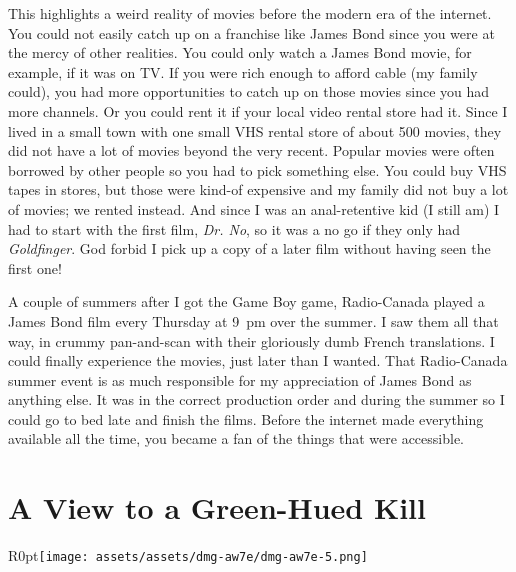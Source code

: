 \documentclass{book}
\begin{document}
This highlights a weird reality of movies before the modern era of the internet. You could not easily catch up on a franchise like James Bond since you were at the mercy of other realities. You could only watch a James Bond movie, for example, if it was on TV. If you were rich enough to afford cable (my family could), you had more opportunities to catch up on those movies since you had more channels. Or you could rent it if your local video rental store had it. Since I lived in a small town with one small VHS rental store of about 500 movies, they did not have a lot of movies beyond the very recent. Popular movies were often borrowed by other people so you had to pick something else. You could buy VHS tapes in stores, but those were kind-of expensive and my family did not buy a lot of movies; we rented instead. And since I was an anal-retentive kid (I still am) I had to start with the first film, \emph{Dr. No}, so it was a no go if they only had \emph{Goldfinger}. God forbid I pick up a copy of a later film without having seen the first one!\par
A couple of summers after I got the Game Boy game, Radio-Canada played a James Bond film every Thursday at 9~pm over the summer. I saw them all that way, in crummy pan-and-scan with their gloriously dumb French translations. I could finally experience the movies, just later than I wanted. That Radio-Canada summer event is as much responsible for my appreciation of James Bond as anything else. It was in the correct production order and during the summer so I could go to bed late and finish the films. Before the internet made everything available all the time, you became a fan of the things that were accessible.\par
\FloatBarrier\vspace{\baselineskip}\begin{figure}[H]\end{figure}
\FloatBarrier\section*{A View to a Green-Hued Kill}
\begin{wrapfigure}{R}{0pt}{\texttt{[image: assets/assets/dmg-aw7e/dmg-aw7e-5.png]}}\end{wrapfigure}
\end{document}
